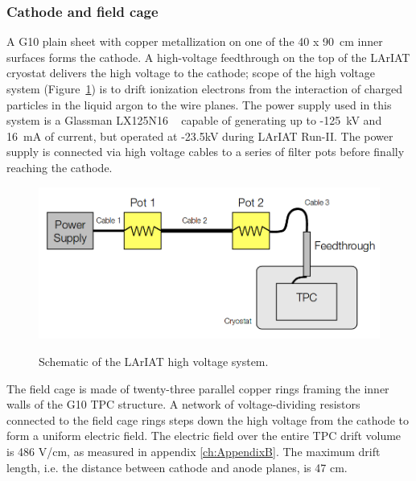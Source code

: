 \subsubsection{Cathode and field cage}
A G10 plain sheet with copper metallization on one of the 40 x 90~cm inner surfaces forms the cathode. 
A high-voltage feedthrough on the top of the LArIAT cryostat delivers the high voltage to the cathode; scope of the high voltage system (Figure~\ref{fig:HVScheme}) is to drift ionization electrons from the interaction of charged particles in the liquid argon to the wire planes.  The power supply used in this system is a Glassman LX125N16 ~\cite{GlassmanPS} capable of generating up to -125~kV and 16~mA of current, but operated at -23.5kV during LArIAT Run-II. The power supply is connected via high voltage cables to a series of filter pots before finally reaching the cathode. 

\begin{figure}[htb]
\centering
\includegraphics[scale=0.35]{Chapter-3/Images//HVSchematic.png}\\
\caption{Schematic of the LArIAT high voltage system.}
\label{fig:HVScheme}
\end{figure}%



The field cage is made of twenty-three parallel copper rings framing the inner walls of the G10 TPC structure. A network of voltage-dividing resistors connected to the field cage rings steps down the high voltage from the cathode to form a uniform electric field. The electric field over the entire TPC drift volume is  486 V/cm, as measured in appendix \ref{ch:AppendixB}. The  maximum drift length, i.e. the distance between cathode and anode planes, is 47 cm.

